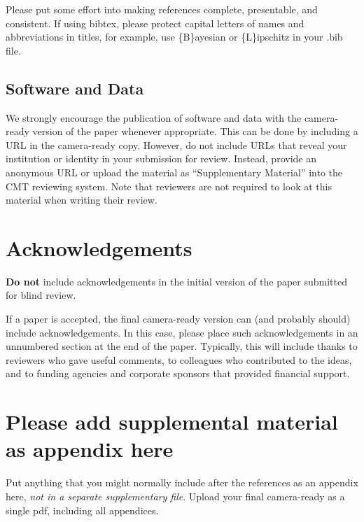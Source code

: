 \documentclass{article}
\begin{document}
Please put some effort into making references complete, presentable, and
consistent. If using bibtex, please protect capital letters of names and
abbreviations in titles, for example, use \{B\}ayesian or \{L\}ipschitz
in your .bib file.

\subsection{Software and Data}

We strongly encourage the publication of software and data with the
camera-ready version of the paper whenever appropriate. This can be
done by including a URL in the camera-ready copy. However, do not
include URLs that reveal your institution or identity in your
submission for review. Instead, provide an anonymous URL or upload
the material as ``Supplementary Material'' into the CMT reviewing
system. Note that reviewers are not required to look at this material
when writing their review.

\section*{Acknowledgements}

\textbf{Do not} include acknowledgements in the initial version of
the paper submitted for blind review.

If a paper is accepted, the final camera-ready version can (and
probably should) include acknowledgements. In this case, please
place such acknowledgements in an unnumbered section at the
end of the paper. Typically, this will include thanks to reviewers
who gave useful comments, to colleagues who contributed to the ideas,
and to funding agencies and corporate sponsors that provided financial
support.


\nocite{langley00}
\fi





\appendix
\section{Please add supplemental material as appendix here}
%
Put anything that you might normally include after the references as an appendix here, {\it not in a separate supplementary file}. Upload your final camera-ready as a single pdf, including all appendices.

\end{document}
